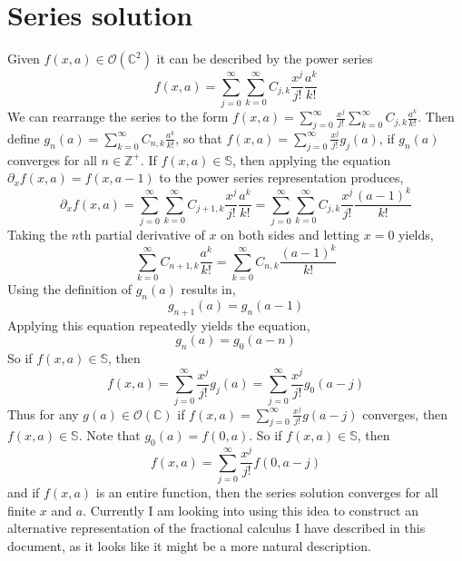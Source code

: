 \documentclass[%
 onecolumn,
 amsmath, amssymb, aps, pra, 10pt
]{revtex4-2}
\begin{document}
\section*{Series solution}
Given $f(x, a) \in \mathcal{O}(\mathbb{C}^2)$ it can be described by the power series
$$f(x, a) = \sum_{j=0}^{\infty} \sum_{k=0}^{\infty} C_{j, k} \frac{x^j}{j!} \frac{a^k}{k!}$$
We can rearrange the series to the form $f(x, a) = \sum_{j=0}^{\infty} \frac{x^j}{j!} \sum_{k=0}^{\infty} C_{j, k} \frac{a^k}{k!}$. Then define $g_n(a) = \sum_{k=0}^{\infty} C_{n, k} \frac{a^k}{k!}$, so that $f(x, a) = \sum_{j=0}^{\infty} \frac{x^j}{j!} g_j(a)$, if $g_n(a)$ converges for all $n \in \mathbb{Z}^+$. If $f(x, a) \in \mathbb{S}$, then applying the equation $\partial_x f(x, a) = f(x, a - 1)$ to the power series representation produces,
$$\partial_x f(x, a) = \sum_{j=0}^{\infty} \sum_{k=0}^{\infty} C_{j + 1, k} \frac{x^j}{j!} \frac{a^k}{k!} = \sum_{j=0}^{\infty} \sum_{k=0}^{\infty} C_{j, k} \frac{x^j}{j!} \frac{(a - 1)^k}{k!}$$
Taking the $n$th partial derivative of $x$ on both sides and letting $x=0$ yields,
$$\sum_{k=0}^{\infty} C_{n + 1, k} \frac{a^k}{k!} = \sum_{k=0}^{\infty} C_{n, k} \frac{(a -1)^k}{k!}$$
Using the definition of $g_n(a)$ results in,
$$g_{n+1}(a) = g_{n}(a - 1)$$
Applying this equation repeatedly yields the equation,
$$g_{n}(a) = g_{0}(a - n)$$
So if $f(x, a) \in \mathbb{S}$, then
$$f(x, a) = \sum_{j=0}^{\infty} \frac{x^j}{j!} g_{j}(a) = \sum_{j=0}^{\infty} \frac{x^j}{j!} g_{0}(a - j)$$
Thus for any $g(a) \in \mathcal{O}(\mathbb{C})$ if $f(x, a) = \sum_{j=0}^{\infty} \frac{x^j}{j!} g(a - j)$ converges, then $f(x, a) \in \mathbb{S}$. Note that $g_{0}(a) = f(0, a)$. So if $f(x, a) \in \mathbb{S}$, then 
\begin{equation}
f(x, a) = \sum_{j=0}^{\infty} \frac{x^j}{j!} f(0, a - j)
\label{series_solution}
\end{equation}
and if $f(x, a)$ is an entire function, then the series solution converges for all finite $x$ and $a$. Currently I am looking into using this idea to construct an alternative representation of the fractional calculus I have described in this document, as it looks like it might be a more natural description.



\end{document}
